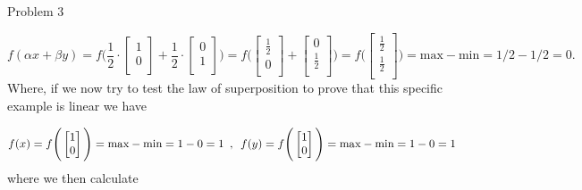 \begin{problem}{Problem 3}
\begin{Highlight}
        \begin{equation}
            f(\alpha x + \beta y) = f \Bigg( \frac{1}{2} \cdot
                \begin{bmatrix}
                    1 \\
                    0 \\
                \end{bmatrix}
                + \frac{1}{2} \cdot
                \begin{bmatrix}
                    0 \\
                    1 \\
                \end{bmatrix} 
                \Bigg) = 
                f \Bigg ( 
                \begin{bmatrix}
                    \frac{1}{2} \\
                    0 \\
                \end{bmatrix}
                + 
                \begin{bmatrix}
                    0 \\
                    \frac{1}{2} \\
                \end{bmatrix}
                \Bigg) = f \Bigg(
                \begin{bmatrix}
                    \frac{1}{2} \\
                    \frac{1}{2} \\
                \end{bmatrix}
                \Bigg) = \text{max} - \text{min} = 1/2 - 1/2 = 0.
        \end{equation}
        Where, if we now try to test the law of superposition to prove that this specific example is linear we have

        \begin{equation}
            f(x) = f \Bigg(
                \begin{bmatrix}
                    1 \\
                    0 \\
                \end{bmatrix}
                \Bigg) = \text{max} - \text{min} = 1 - 0 = 1 \hspace*{5pt} , \hspace*{5pt}
            f(y) = f \Bigg(
                \begin{bmatrix}
                    1 \\
                    0 \\
                \end{bmatrix}
                \Bigg) = \text{max} - \text{min} = 1 - 0 = 1
        \end{equation}
        where we then calculate 


\end{Highlight}
\end{problem}
